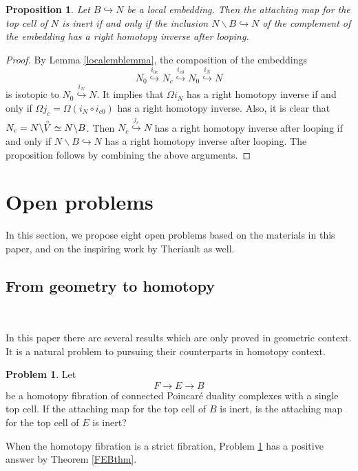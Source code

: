 \documentclass[a4]{amsart}
\newtheorem{proposition}[theorem]{Proposition}
\theoremstyle{definition}
\newtheorem{problem}[theorem]{Problem}
\begin{document}
\begin{sloppypar}
\begin{proposition}\label{localembprop}
Let $B\stackrel{}{\hookrightarrow}N$ be a local embedding. Then the attaching map for the top cell of $N$ is inert if and only if the inclusion $N\backslash B\stackrel{}{\hookrightarrow} N$ of the complement of the embedding has a right homotopy inverse after looping.
\end{proposition}
\begin{proof}
By Lemma \ref{localemblemma}, the composition of the embeddings
\[
N_0\stackrel{i_{0c}}{\hookrightarrow} N_c \stackrel{i_{c0}}{\hookrightarrow} N_0 \stackrel{i_N}{\hookrightarrow} N
\]
is isotopic to $N_0 \stackrel{i_N}{\hookrightarrow} N$. It implies that $\Omega i_N$ has a right homotopy inverse if and only if $\Omega j_c=\Omega (i_N\circ i_{c0})$ has a right homotopy inverse. Also, it is clear that $N_c=N\backslash\accentset{\circ}{V}\simeq N\backslash B$. Then $N_c\stackrel{j_c}{\hookrightarrow} N$ has a right homotopy inverse after looping if and only if $N\backslash B\stackrel{}{\hookrightarrow} N$ has a right homotopy inverse after looping. The proposition follows by combining the above arguments. 
\end{proof}


\newpage
\section{Open problems}
\label{sec: prob}
In this section, we propose eight open problems based on the materials in this paper, and on the inspiring work \cite{The24b} by Theriault as well. 

\subsection{From geometry to homotopy}

$\, $

In this paper there are several results which are only proved in geometric context. It is a natural problem to pursuing their counterparts in homotopy context. 

\begin{problem}\label{FEB-prop}
Let 
\[
F\stackrel{}{\longrightarrow} E\stackrel{}{\longrightarrow} B
\]
 be a homotopy fibration of connected Poincar\'{e} duality complexes with a single top cell. 
 If the attaching map for the top cell of $B$ is inert, is the attaching map for the top cell of $E$ is inert?
\end{problem}
When the homotopy fibration is a strict fibration, Problem \ref{FEB-prop} has a positive answer by Theorem \ref{FEBthm}. 


\end{sloppypar}
\end{document}
